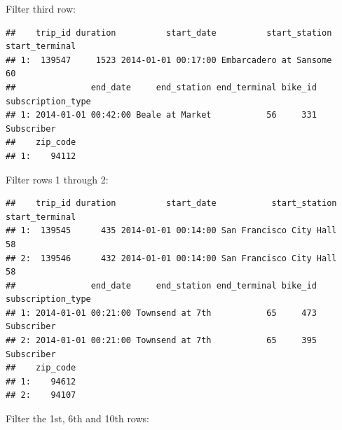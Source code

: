 \documentclass[]{book}
\newenvironment{Shaded}{\begin{snugshade}}{\end{snugshade}}
\newcommand{\DecValTok}[1]{\textcolor[rgb]{0.00,0.00,0.81}{#1}}
\newcommand{\KeywordTok}[1]{\textcolor[rgb]{0.13,0.29,0.53}{\textbf{#1}}}
\newcommand{\NormalTok}[1]{#1}
\newcommand{\OperatorTok}[1]{\textcolor[rgb]{0.81,0.36,0.00}{\textbf{#1}}}
\newcommand{\StringTok}[1]{\textcolor[rgb]{0.31,0.60,0.02}{#1}}
\begin{document}
Filter third row:

\begin{Shaded}
\end{Shaded}

\begin{verbatim}
##    trip_id duration          start_date          start_station start_terminal
## 1:  139547     1523 2014-01-01 00:17:00 Embarcadero at Sansome             60
##               end_date     end_station end_terminal bike_id subscription_type
## 1: 2014-01-01 00:42:00 Beale at Market           56     331        Subscriber
##    zip_code
## 1:    94112
\end{verbatim}

Filter rows 1 through 2:

\begin{Shaded}
\end{Shaded}

\begin{verbatim}
##    trip_id duration          start_date           start_station start_terminal
## 1:  139545      435 2014-01-01 00:14:00 San Francisco City Hall             58
## 2:  139546      432 2014-01-01 00:14:00 San Francisco City Hall             58
##               end_date     end_station end_terminal bike_id subscription_type
## 1: 2014-01-01 00:21:00 Townsend at 7th           65     473        Subscriber
## 2: 2014-01-01 00:21:00 Townsend at 7th           65     395        Subscriber
##    zip_code
## 1:    94612
## 2:    94107
\end{verbatim}

Filter the 1st, 6th and 10th rows:

\begin{Shaded}
\end{Shaded}
\end{document}
